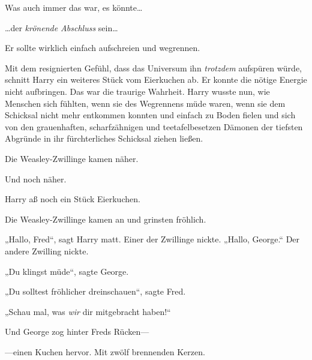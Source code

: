 Was auch immer das war, es könnte…

…der \emph{krönende Abschluss} sein…

Er sollte wirklich einfach aufschreien und wegrennen.

Mit dem resignierten Gefühl, dass das Universum ihn \emph{trotzdem} aufspüren würde, schnitt Harry ein weiteres Stück vom Eierkuchen ab. Er konnte die nötige Energie nicht aufbringen. Das war die traurige Wahrheit. Harry wusste nun, wie Menschen sich fühlten, wenn sie des Wegrennens müde waren, wenn sie dem Schicksal nicht mehr entkommen konnten und einfach zu Boden fielen und sich von den grauenhaften, scharfzähnigen und teetafelbesetzen Dämonen der tiefsten Abgründe in ihr fürchterliches Schicksal ziehen ließen.

Die Weasley-Zwillinge kamen näher.

Und noch näher.

Harry aß noch ein Stück Eierkuchen.

Die Weasley-Zwillinge kamen an und grinsten fröhlich.

„Hallo, Fred“, sagt Harry matt. Einer der Zwillinge nickte. „Hallo, George.“ Der andere Zwilling nickte.

„Du klingst müde“, sagte George.

„Du solltest fröhlicher dreinschauen“, sagte Fred.

„Schau mal, was \emph{wir} dir mitgebracht haben!“

Und George zog hinter Freds Rücken—

—einen Kuchen hervor. Mit zwölf brennenden Kerzen.

